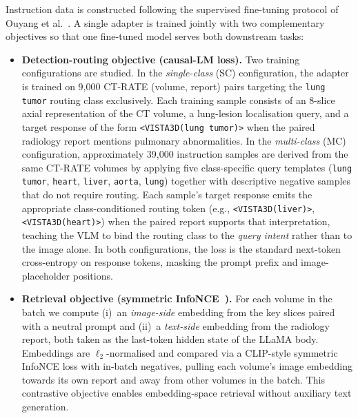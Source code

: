 \documentclass[lineno,referee,pdflatex,sn-mathphys-num]{sn-jnl}
\begin{document}
Instruction data is constructed following the supervised fine-tuning
protocol of Ouyang et al.~\cite{ouyang2022}. A single adapter is trained
jointly with two complementary objectives so that one fine-tuned model
serves both downstream tasks:

\begin{itemize}
  \item \textbf{Detection-routing objective (causal-LM loss).}
    Two training configurations are studied.
    In the \emph{single-class} (SC) configuration, the adapter is trained
    on 9{,}000 CT-RATE (volume, report) pairs targeting the
    \texttt{lung tumor} routing class exclusively. Each training sample
    consists of an 8-slice axial representation of the CT volume, a
    lung-lesion localisation query, and a target response of the form
    \texttt{<VISTA3D(lung tumor)>} when the paired radiology report
    mentions pulmonary abnormalities.
    In the \emph{multi-class} (MC) configuration, approximately
    39{,}000 instruction samples are derived from the same CT-RATE volumes
    by applying five class-specific query templates
    (\texttt{lung tumor}, \texttt{heart}, \texttt{liver}, \texttt{aorta},
    \texttt{lung}) together with descriptive negative samples that do not
    require routing. Each sample's target response emits the appropriate
    class-conditioned routing token
    (e.g., \texttt{<VISTA3D(liver)>}, \texttt{<VISTA3D(heart)>}) when the
    paired report supports that interpretation, teaching the VLM to bind
    the routing class to the \emph{query intent} rather than to the image
    alone. In both configurations, the loss is the standard next-token
    cross-entropy on response tokens, masking the prompt prefix and
    image-placeholder positions.

  \item \textbf{Retrieval objective (symmetric InfoNCE~\cite{oord2018}).}
    For each volume in the batch we compute (i)~an \emph{image-side}
    embedding from the key slices paired with a neutral prompt and
    (ii)~a \emph{text-side} embedding from the radiology report, both
    taken as the last-token hidden state of the LLaMA body. Embeddings
    are $\ell_2$-normalised and compared via a CLIP-style symmetric
    InfoNCE loss with in-batch negatives, pulling each volume's image
    embedding towards its own report and away from other volumes in the
    batch. This contrastive objective enables embedding-space retrieval
    without auxiliary text generation.
\end{itemize}
\end{document}

